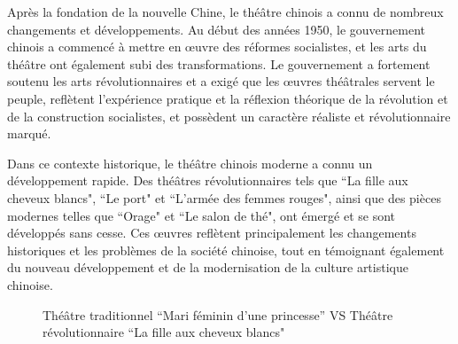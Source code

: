\documentclass[UTF8,a4paper,12pt]{ctexart}
\numberwithin{equation}{section}
\newcommand{\mycite}[1]{\cite{#1}}
\begin{document}
Après la fondation de la nouvelle Chine, le théâtre chinois a connu de nombreux changements et développements. Au début des années 1950, le gouvernement chinois a commencé à mettre en œuvre des réformes socialistes, et les arts du théâtre ont également subi des transformations. Le gouvernement a fortement soutenu les arts révolutionnaires et a exigé que les œuvres théâtrales servent le peuple, reflètent l'expérience pratique et la réflexion théorique de la révolution et de la construction socialistes, et possèdent un caractère réaliste et révolutionnaire marqué\mycite{17}.

Dans ce contexte historique, le théâtre chinois moderne a connu un développement rapide. Des théâtres révolutionnaires tels que ``La fille aux cheveux blancs", ``Le port" et ``L'armée des femmes rouges", ainsi que des pièces modernes telles que ``Orage" et ``Le salon de thé", ont émergé et se sont développés sans cesse. Ces œuvres reflètent principalement les changements historiques et les problèmes de la société chinoise, tout en témoignant également du nouveau développement et de la modernisation de la culture artistique chinoise.

\begin{figure}[h!]
\centering
{}%
\hspace*{0.5cm} %
\captionsetup{justification=centering, singlelinecheck=false}
\caption{Théâtre traditionnel ``Mari féminin d'une princesse'' VS  Théâtre révolutionnaire ``La fille aux cheveux blancs"}

\end{figure}
\end{document}
